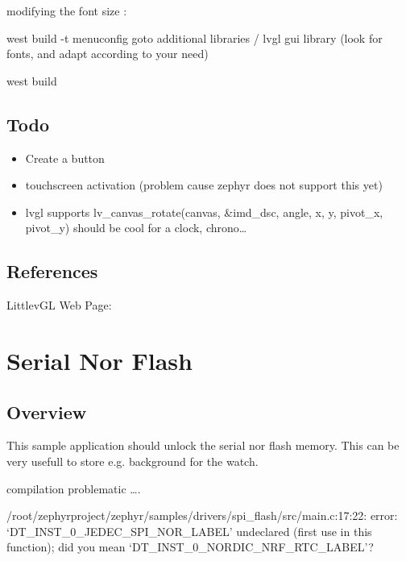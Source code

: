 \documentclass[letterpaper,10pt,english]{sphinxmanual}
\begin{document}
modifying the font size :

west build -t menuconfig
goto additional libraries / lvgl gui library
(look for fonts, and adapt according to your need)

west build


\section{Todo}
\label{\detokenize{lvgl:todo}}\begin{itemize}
\item {} 
Create a button

\item {} 
touchscreen activation (problem cause zephyr does not support this yet)

\item {} 
lvgl supports lv\_canvas\_rotate(canvas, \&imd\_dsc, angle, x, y, pivot\_x, pivot\_y) should be cool for a clock, chrono…

\end{itemize}


\section{References}
\label{\detokenize{lvgl:references}}

LittlevGL Web Page: 


\chapter{Serial Nor Flash}
\label{\detokenize{spinor:serial-nor-flash}}\label{\detokenize{spinor::doc}}
\begin{sphinxVerbatim}[commandchars=\\\{\}]
\end{sphinxVerbatim}


\section{Overview}
\label{\detokenize{spinor:overview}}
This sample application should unlock the serial nor flash memory.
This can be very usefull to store e.g. background for the watch.

compilation problematic ….

/root/zephyrproject/zephyr/samples/drivers/spi\_flash/src/main.c:17:22: error: ‘DT\_INST\_0\_JEDEC\_SPI\_NOR\_LABEL’ undeclared (first use in this function); did you mean ‘DT\_INST\_0\_NORDIC\_NRF\_RTC\_LABEL’?
\end{document}
